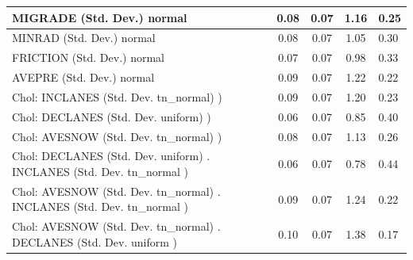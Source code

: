 \begin{table}
\begin{center}
\begin{tabular}{|l|l|c|c|c|l|}
			\hline
			MIGRADE (Std. Dev.) normal &  & 0.08 & 0.07 & 1.16 & 0.25 \\
			\hline
			MINRAD (Std. Dev.) normal &  & 0.08 & 0.07 & 1.05 & 0.30 \\
			\hline
			FRICTION (Std. Dev.) normal &  & 0.07 & 0.07 & 0.98 & 0.33 \\
			\hline
			AVEPRE (Std. Dev.) normal &  & 0.09 & 0.07 & 1.22 & 0.22 \\
			\hline
			 Chol: INCLANES (Std. Dev. tn_normal) ) &  & 0.09 & 0.07 & 1.20 & 0.23 \\
			\hline
			 Chol: DECLANES (Std. Dev. uniform) ) &  & 0.06 & 0.07 & 0.85 & 0.40 \\
			\hline
			 Chol: AVESNOW (Std. Dev. tn_normal) ) &  & 0.08 & 0.07 & 1.13 & 0.26 \\
			\hline
			 Chol: DECLANES (Std. Dev. uniform) . INCLANES (Std. Dev.   tn_normal ) &  & 0.06 & 0.07 & 0.78 & 0.44 \\
			\hline
			 Chol: AVESNOW (Std. Dev. tn_normal) . INCLANES (Std. Dev.   tn_normal ) &  & 0.09 & 0.07 & 1.24 & 0.22 \\
			\hline
			 Chol: AVESNOW (Std. Dev. tn_normal) . DECLANES (Std. Dev.   uniform ) &  & 0.10 & 0.07 & 1.38 & 0.17 \\
			\hline
		\end{tabular}
	\end{center}
\end{table}